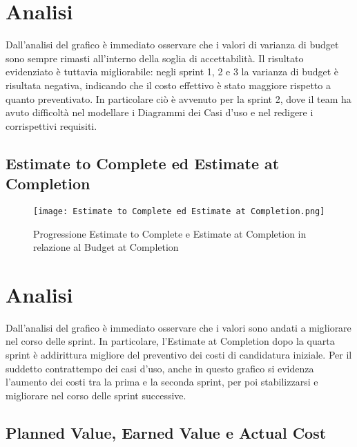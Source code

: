 \section*{Analisi}

Dall’analisi del grafico è immediato osservare che i valori di varianza di budget sono
sempre rimasti all’interno della soglia di accettabilità. Il risultato evidenziato è 
tuttavia migliorabile: negli sprint 1, 2 e 3 la varianza di budget è risultata negativa,
indicando che il costo effettivo è stato maggiore rispetto a quanto preventivato. In
particolare ciò è avvenuto per la sprint 2, dove il team ha avuto difficoltà nel
modellare i Diagrammi dei Casi d'uso e nel redigere i corrispettivi requisiti.

\newpage

\subsection{Estimate to Complete ed Estimate at Completion}
\label{subsec:Estimate to Complete ed Estimate at Completion}

\begin{figure}[h] 
    \centering
    \texttt{[image: Estimate to Complete ed Estimate at Completion.png]}
    \caption{Progressione Estimate to Complete e Estimate at Completion in relazione al Budget at Completion} 
    \label{fig: Estimate to Complete ed Estimate at Completion}
\end{figure}

\section*{Analisi}

Dall’analisi del grafico è immediato osservare che i valori sono andati a migliorare
nel corso delle sprint. In particolare, l’Estimate at Completion dopo la quarta sprint
è addirittura migliore del preventivo dei costi di candidatura iniziale. Per il suddetto
contrattempo dei casi d'uso, anche in questo grafico si evidenza l'aumento dei costi tra la prima
e la seconda sprint, per poi stabilizzarsi e migliorare nel corso delle sprint successive.

\newpage

\subsection{Planned Value, Earned Value e Actual Cost}
\label{subsec:Planned Value, Earned Value e Actual Cost}

